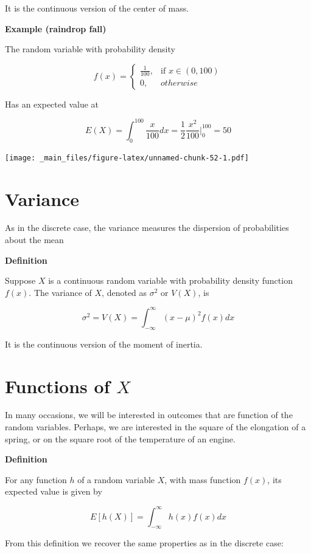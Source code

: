 \documentclass[
]{book}
\begin{document}
It is the continuous version of the center of mass.

\textbf{Example (raindrop fall)}

The random variable with probability density

\[
    f(x)= 
\begin{cases}
    \frac{1}{100},& \text{if } x\in (0,100)\\
    0,& otherwise 
\end{cases}
\]

Has an expected value at

\[E(X)=\int_{0}^{100} \frac{x}{100}dx= \frac{1}{2}\frac{x^2}{100} |_0^{100}= 50\]

\texttt{[image: \_main\_files/figure-latex/unnamed-chunk-52-1.pdf]}

\hypertarget{variance-1}{%
\section{Variance}\label{variance-1}}

As in the discrete case, the variance measures the dispersion of probabilities about the mean

\textbf{Definition}

Suppose \(X\) is a continuous random variable with probability density function \(f(x)\). The variance of \(X\), denoted as \(\sigma^2\) or \(V(X)\), is

\[\sigma^2=V(X)=\int_{-\infty}^\infty (x-\mu)^2 f(x) dx\]

It is the continuous version of the moment of inertia.

\hypertarget{functions-of-x}{%
\section{\texorpdfstring{Functions of \(X\)}{Functions of X}}\label{functions-of-x}}

In many occasions, we will be interested in outcomes that are function of the random variables. Perhaps, we are interested in the square of the elongation of a spring, or on the square root of the temperature of an engine.

\textbf{Definition}

For any function \(h\) of a random variable \(X\), with mass function \(f(x)\), its expected value is given by

\[E[h(X)]= \int_{-\infty}^{\infty} h(x) f(x)dx\]

From this definition we recover the same properties as in the discrete case:
\end{document}
